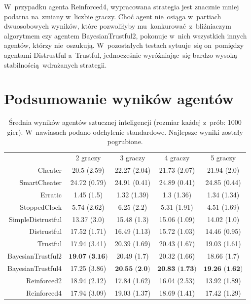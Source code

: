 \documentclass[declaration,shortabstract,inz]{iithesis}
\begin{document}
W~przypadku agenta Reinforced4, wypracowana strategia jest znacznie mniej podatna na~zmiany w~liczbie graczy. Choć agent nie~osiąga w~partiach dwuosobowych wyników, które pozwoliłyby mu~konkurować z~bliźniaczym algorytmem czy agentem BayesianTrustful2, pokonuje w~nich wszystkich innych agentów, którzy nie~oszukują. W~pozostałych testach sytuuje~się on~pomiędzy agentami Distrustful a~Trustful, jednocześnie wyróżniając~się bardzo wysoką stabilnością wdrażanych strategii.

\chapter{Podsumowanie wyników agentów}
 
\begin{table}[H]
	\centering
	\captionsetup{format=hang}
	\begin{tabular}{ r|c|c|c|c| }		
 		\multicolumn{1}{r}{}		
 		 & \multicolumn{1}{c}{2 graczy}		
 		 & \multicolumn{1}{c}{3 graczy}		
 		 & \multicolumn{1}{c}{4 graczy}		
 		 & \multicolumn{1}{c}{5 graczy} \\		
 		\cline{2-5}		
 		Cheater & 20.5 (2.59) & 22.27 (2.04) & 21.73 (2.07) & 21.94 (2.0) \\		
 		\cline{2-5}		
 		SmartCheater & 24.72 (0.79) & 24.91 (0.41) & 24.89 (0.41) & 24.85 (0.44) \\		
 		\cline{2-5}		
 		Erratic & 1.45 (1.5) & 1.32 (1.39) & 1.3 (1.36) & 1.34 (1.34) \\
 		\cline{2-5}		
 		StoppedClock & 5.74 (2.62) & 6.25 (2.2) & 5.31 (1.91) & 4.51 (1.69) \\
 		\cline{2-5}		
 		SimpleDistrustful & 13.37 (3.0) & 15.48 (1.3) & 15.06 (1.09) & 14.02 (1.0) \\
 		\cline{2-5}		
 		Distrustful & 17.52 (1.71) & 16.49 (1.13) & 15.72 (1.03) & 14.46 (0.95) \\
 		\cline{2-5}		
 		Trustful & 17.94 (3.41) & 20.39 (1.69) & 20.43 (1.67) & 19.03 (1.61) \\
 		\cline{2-5}		
 		BayesianTrustful2 & $\textbf{19.07 (3.16)}$ & 20.49 (1.7) & 20.32 (1.66) & 18.66 (1.7) \\
 		\cline{2-5}		
 		BayesianTrustful4 & 17.25 (3.86) & $\textbf{20.55 (2.0)}$ & $\textbf{20.83 (1.73)}$ & $\textbf{19.26 (1.62)}$ \\
 		\cline{2-5}		
 		Reinforced2 & 18.94 (2.12) & 17.84 (1.62) & 16.04 (2.53) & 13.92 (1.89) \\
 		\cline{2-5}		
 		Reinforced4 & 17.94 (3.09) & 19.03 (1.37) & 18.69 (1.41) & 17.42 (1.29) \\
 		\cline{2-5}		
 	\end{tabular}		
 	\caption{Średnia wyników agentów sztucznej inteligencji (rozmiar każdej z~prób: 1000 gier). W~nawiasach podano odchylenie standardowe. Najlepsze wyniki zostały pogrubione.}		
 	\label{table:summary}		
 \end{table}
 
\end{document}

